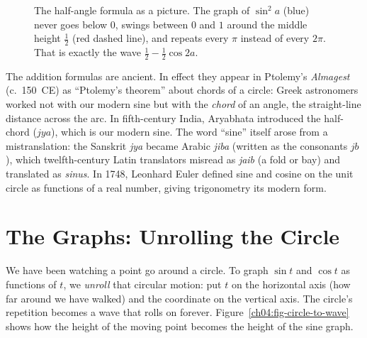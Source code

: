 \begin{figure}[htbp]
\centering
{}
\caption{The half-angle formula as a picture. The graph of $\sin^2 a$ (blue) never goes below $0$, swings between $0$ and $1$ around the middle height $\tfrac12$ (red dashed line), and repeats every $\pi$ instead of every $2\pi$. That is exactly the wave $\tfrac12 - \tfrac12\cos 2a$.}
\label{ch04:fig-half-angle}
\end{figure}

\begin{historybox}
The addition formulas are ancient. In effect they appear in Ptolemy's \emph{Almagest} (c.\ 150~CE) as ``Ptolemy's theorem'' about chords of a circle: Greek astronomers worked not with our modern sine but with the \emph{chord} of an angle, the straight-line distance across the arc. In fifth-century India, Aryabhata introduced the half-chord ($jya$), which is our modern sine. The word ``sine'' itself arose from a mistranslation: the Sanskrit \emph{jya} became Arabic \emph{jiba} (written as the consonants $jb$), which twelfth-century Latin translators misread as \emph{jaib} (a fold or bay) and translated as \emph{sinus}. In 1748, Leonhard Euler defined sine and cosine on the unit circle as functions of a real number, giving trigonometry its modern form.
\end{historybox}

\section{The Graphs: Unrolling the Circle}
\label{ch04:graphs}

We have been watching a point go around a circle. To graph $\sin t$ and $\cos t$ as functions of $t$, we \emph{unroll} that circular motion: put $t$ on the horizontal axis (how far around we have walked) and the coordinate on the vertical axis. The circle's repetition becomes a wave that rolls on forever. Figure~\ref{ch04:fig-circle-to-wave} shows how the height of the moving point becomes the height of the sine graph.

